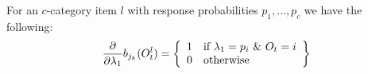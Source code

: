 \documentclass[a4paper,12pt,doc]{apaIngmar} %
\begin{document}
For an $c$-category item $l$ with response probabilities $p_{1}, 
\ldots, p_{c}$ we have the following:
\begin{align} 
	\frac{\partial} {\partial \lambda_{1}} b_{j_{k}}(O_{t}^{l})= \left\{ 
	\begin{array}{ll} 
		1 & \mbox{if $\lambda_{1} = p_{i}$ \& $O_{t}=i$}  \\ 
		0 & \mbox{otherwise} 
	\end{array} 
	\right\}
\end{align}



\end{document}
